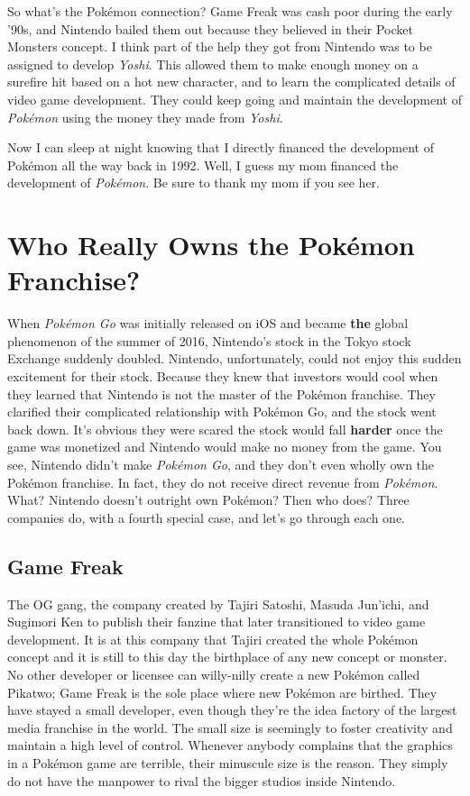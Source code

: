 \documentclass{book}
\begin{document}
So what’s the Pokémon connection? Game Freak was cash poor during the early ’90s, and Nintendo bailed them out because they believed in their Pocket Monsters concept. I think part of the help they got from Nintendo was to be assigned to develop \emph{Yoshi}. This allowed them to make enough money on a surefire hit based on a hot new character,
 and to learn the complicated details of video game development. They could keep going and maintain the development of \emph{Pokémon} using the money they made from \emph{Yoshi}.

Now I can sleep at night knowing that I directly financed the development of Pokémon all the way back in 1992. Well, I guess my mom financed the development of \emph{Pokémon}. Be sure to thank my mom if you see her.

\FloatBarrier\needspace{10mm}\section*{Who Really Owns the Pokémon Franchise?}\nopagebreak[4]

When \emph{Pokémon Go} was initially released on iOS and became \textbf{the} global phenomenon of the summer of 2016, Nintendo’s stock in the Tokyo stock Exchange suddenly doubled. Nintendo, unfortunately, could not enjoy this sudden excitement for their stock. Because they knew that investors would cool when they learned that Nintendo is not the master of the Pokémon franchise. They clarified their complicated relationship with Pokémon Go, and the stock went back down. It’s obvious they were scared the stock would fall \textbf{harder} once the game was monetized and Nintendo would make no money from the game. You see, Nintendo didn’t make \emph{Pokémon Go}, and they don’t even wholly own the Pokémon franchise. In fact, they do not receive direct revenue from \emph{Pokémon}. What? Nintendo doesn’t outright own Pokémon? Then who does? Three companies do, with a fourth special case, and let’s go through each one.

\subsection*{Game Freak}\nopagebreak[4]

The OG gang, the company created by Tajiri Satoshi, Masuda Jun’ichi, and Sugimori Ken to publish their fanzine that later transitioned to video game development. It is at this company that Tajiri created the whole Pokémon concept and it is still to this day the birthplace of any new concept or monster. No other developer or licensee can willy-nilly create a new Pokémon called Pikatwo; Game Freak is the sole place where new Pokémon are birthed. They have stayed a small developer, even though they’re the idea factory of the largest media franchise in the world. The small size is seemingly to foster creativity and maintain a high level of control. Whenever anybody complains that the graphics in a Pokémon game are terrible, their minuscule size is the reason. They simply do not have the manpower to rival the bigger studios inside Nintendo.
\end{document}

